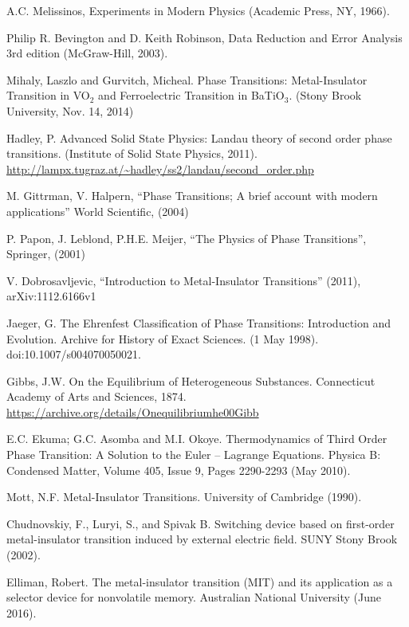 \documentclass[%
 reprint,
 amsmath,amssymb,
 aps,
 pra,
]{revtex4-1}
\begin{document}
\begin{thebibliography}{6}
	
	A.C. Melissinos, Experiments in Modern Physics (Academic Press, NY, 1966).
	
	Philip R. Bevington and D. Keith Robinson, Data Reduction and Error Analysis 3rd edition (McGraw-Hill, 2003).
	
	Mihaly, Laszlo and Gurvitch, Micheal. Phase Transitions: Metal-Insulator Transition in VO$_2$ and Ferroelectric Transition in BaTiO$_3$. (Stony Brook University, Nov. 14, 2014)
	
	Hadley, P. Advanced Solid State Physics: Landau theory of second order phase transitions. (Institute of Solid State Physics, 2011). \url{http://lampx.tugraz.at/~hadley/ss2/landau/second_order.php}
	
	M. Gittrman, V. Halpern, “Phase Transitions; A brief account with modern applications” World
Scientific, (2004)

	P. Papon, J. Leblond, P.H.E. Meijer, “The Physics of Phase Transitions”, Springer, (2001)
	
	V. Dobrosavljevic, “Introduction to Metal-Insulator Transitions” (2011), arXiv:1112.6166v1
	
	Jaeger, G. The Ehrenfest Classification of Phase Transitions: Introduction and Evolution. Archive for History of Exact Sciences. (1 May 1998). doi:10.1007/s004070050021.
	
	Gibbs, J.W. On the Equilibrium of Heterogeneous Substances. Connecticut Academy of Arts and Sciences, 1874. \url{https://archive.org/details/Onequilibriumhe00Gibb}
	
	E.C. Ekuma; G.C. Asomba and M.I. Okoye. Thermodynamics of Third Order Phase Transition: A Solution to the Euler -- Lagrange Equations. 	Physica B: Condensed Matter, Volume 405, Issue 9, Pages 2290-2293 (May 2010).
	
	Mott, N.F. Metal-Insulator Transitions. University of Cambridge (1990).
	
	Chudnovskiy, F., Luryi, S., and Spivak B. Switching device based on first-order metal-insulator transition induced by external electric field. SUNY Stony Brook (2002).
	
	Elliman, Robert. The metal-insulator transition (MIT) and its application as a selector device for nonvolatile memory. Australian National University (June 2016).
	

\end{thebibliography}
\end{document}
